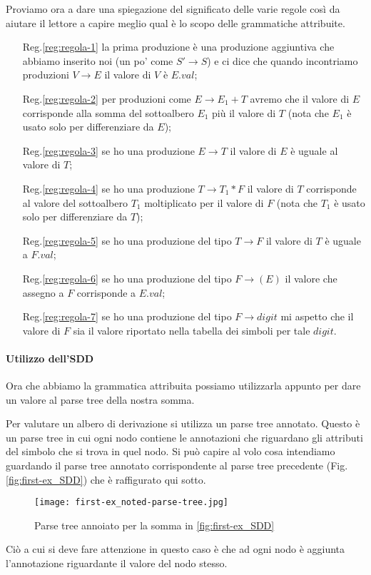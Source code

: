 \documentclass[class=book, crop=false, oneside, 12pt]{standalone}
\begin{document}
\noindent Proviamo ora a dare una spiegazione del significato delle varie regole così da aiutare il lettore a capire meglio qual è lo scopo delle grammatiche attribuite.
\begin{itemize}
    \item[Reg.\ref{reg:regola-1}] la prima produzione è una produzione aggiuntiva che abbiamo inserito noi  (un po' come \(S' \to S\)) e ci dice che quando incontriamo produzioni \(V \to E\) il valore di \(V\) è \(E.val\);
    \item[Reg.\ref{reg:regola-2}] per produzioni come \(E \to E_1 + T\) avremo che il valore di \(E\) corrisponde alla somma del sottoalbero \(E_1\) più il valore di \(T\) (nota che \(E_1\) è usato solo per differenziare da \(E\));
    \item[Reg.\ref{reg:regola-3}] se ho una produzione \(E \to T\) il valore di \(E\) è uguale al valore di \(T\);
    \item[Reg.\ref{reg:regola-4}] se ho una produzione \(T\to T_1 * F\) il valore di \(T\) corrisponde al valore del sottoalbero \(T_1\) moltiplicato per il valore di \(F\) (nota che \(T_1\) è usato solo per differenziare da \(T\));
    \item[Reg.\ref{reg:regola-5}] se ho una produzione del tipo \(T\to F\) il valore di \(T\) è uguale a \(F.val\);
    \item[Reg.\ref{reg:regola-6}] se ho una produzione del tipo \(F \to (E)\) il valore che assegno a \(F\) corrisponde a \(E.val\);
    \item[Reg.\ref{reg:regola-7}] se ho una produzione del tipo \(F \to digit\) mi aspetto che il valore di \(F\) sia il valore riportato nella tabella dei simboli per tale \(digit\).
\end{itemize}

\paragraph*{Utilizzo dell'SDD} Ora che abbiamo la grammatica attribuita possiamo utilizzarla appunto per dare un valore al parse tree della nostra somma.

Per valutare un albero di derivazione si utilizza un parse tree annotato. Questo è un parse tree in cui ogni nodo contiene le annotazioni che riguardano gli attributi del simbolo che si trova in quel nodo.
Si può capire al volo cosa intendiamo guardando il parse tree annotato corrispondente al parse tree precedente (Fig.\ref{fig:first-ex_SDD}) che è raffigurato qui sotto.
\begin{figure}[H]
    \centering
    \texttt{[image: first-ex\_noted-parse-tree.jpg]}
    \caption{Parse tree annoiato per la somma in \ref{fig:first-ex_SDD}}
    \label{fig:first-ex_noted-parse-tree}
\end{figure}
Ciò a cui si deve fare attenzione in questo caso è che ad ogni nodo è aggiunta l'annotazione riguardante il valore del nodo stesso.
\end{document}
